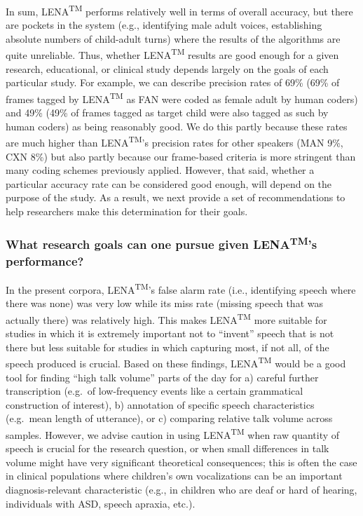 \documentclass[english,floatsintext,man]{apa6}
\begin{document}
In sum, LENA\textsuperscript{TM} performs relatively well in terms of
overall accuracy, but there are pockets in the system (e.g., identifying
male adult voices, establishing absolute numbers of child-adult turns)
where the results of the algorithms are quite unreliable. Thus, whether
LENA\textsuperscript{TM} results are good enough for a given research,
educational, or clinical study depends largely on the goals of each
particular study. For example, we can describe precision rates of 69\%
(69\% of frames tagged by LENA\textsuperscript{TM} as FAN were coded as
female adult by human coders) and 49\% (49\% of frames tagged as target
child were also tagged as such by human coders) as being reasonably
good. We do this partly because these rates are much higher than
LENA\textsuperscript{TM}'s precision rates for other speakers (MAN 9\%,
CXN 8\%) but also partly because our frame-based criteria is more
stringent than many coding schemes previously applied. However, that
said, whether a particular accuracy rate can be considered good enough,
will depend on the purpose of the study. As a result, we next provide a
set of recommendations to help researchers make this determination for
their goals.

\subsubsection{\texorpdfstring{What research goals can one pursue given
LENA\textsuperscript{TM}'s
performance?}{What research goals can one pursue given LENATM's performance?}}\label{what-research-goals-can-one-pursue-given-lenatms-performance}

In the present corpora, LENA\textsuperscript{TM}'s false alarm rate
(i.e., identifying speech where there was none) was very low while its
miss rate (missing speech that was actually there) was relatively high.
This makes LENA\textsuperscript{TM} more suitable for studies in which
it is extremely important not to \enquote{invent} speech that is not
there but less suitable for studies in which capturing most, if not all,
of the speech produced is crucial. Based on these findings,
LENA\textsuperscript{TM} would be a good tool for finding \enquote{high
talk volume} parts of the day for a) careful further transcription
(e.g.~of low-frequency events like a certain grammatical construction of
interest), b) annotation of specific speech characteristics (e.g.~mean
length of utterance), or c) comparing relative talk volume across
samples. However, we advise caution in using LENA\textsuperscript{TM}
when raw quantity of speech is crucial for the research question, or
when small differences in talk volume might have very significant
theoretical consequences; this is often the case in clinical populations
where children's own vocalizations can be an important
diagnosis-relevant characteristic (e.g., in children who are deaf or
hard of hearing, individuals with ASD, speech apraxia, etc.).
\end{document}
